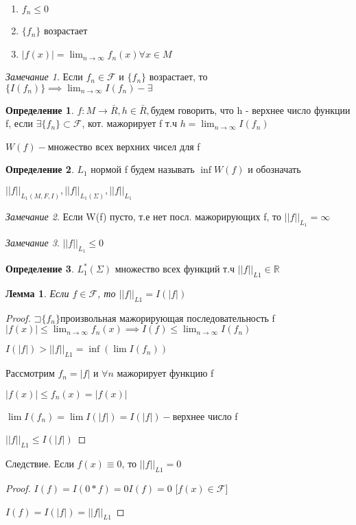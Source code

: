 \documentclass[a4paper]{article}
\newcommand\letsymbol{\mathord{\sqsupset}}
\newtheorem{lemma}{Лемма}[section]
\theoremstyle{definition}
\newtheorem*{definition}{Определение}
\theoremstyle{remark}
\newtheorem*{remark}{Замечание}
\begin{document}
\begin{enumerate}
     \item $f_n\leq 0$
     \item $\{f_n\}$ возрастает
     \item $|f(x)| = \lim_{n\to\infty}f_n(x)\forall x\in M$ 
\end{enumerate}
\begin{remark}
     Если $f_n\in \mathcal{F} $ и $\{f_n\}$ возрастает, то $\{I(f_n)\}\implies \lim_{n\to\infty}I(f_n)-\exists$
\end{remark}
\begin{definition}
     $f:M\to\bar{R}, h\in\bar{R},$будем говорить, что h - верхнее число
     функции f, если $\exists\{f_n\}\subset \mathcal{F} $, кот. мажорирует
     f т.ч $h = \lim_{n\to\infty}I(f_n)$

     $W(f) - $множество всех верхних чисел для f
\end{definition}
\begin{definition}
     $L_1$ нормой f будем называть $\inf W(f)$ и обозначать

     $||f||_{L_1(M, F, I)}, ||f||_{L_1(\Sigma)}, ||f||_{L_1}$
\end{definition}
\begin{remark}
     Если W(f) пусто, т.е нет посл. мажорирующих f, то $||f||_{L_1} = \infty$
\end{remark}
\begin{remark}
     $||f||_{L_1}\leq 0$
\end{remark}
\begin{definition}
     $L_1^*(\Sigma)$ множество всех функций т.ч $||f||_{L1}\in \mathbb{R} $
\end{definition}
\begin{lemma}
     Если $f\in\mathcal{F} $, то $||f||_{L1} = I(|f|)$
\end{lemma}
\begin{proof}
     $\letsymbol{}\{f_n\} $произвольная мажорирующая последовательность f
     $|f(x)|\leq \lim_{n\to\infty}f_n(x)\implies I(f)\leq \lim_{n\to\infty}I(f_n)$

     $I(|f|)>||f||_{L1} = \inf (\lim I(f_n))$

     Рассмотрим $f_n = |f|$ и $\forall n$ мажорирует функцию f

     $|f(x)|\leq f_n(x) = |f(x)|$

     $\lim I(f_n) = \lim I(|f|) = I(|f|) - $верхнее число f

     $||f||_{L1}\leq I(|f|)$
\end{proof}
Следствие. Если $f(x)\equiv 0$, то $||f||_{L1} = 0$
\begin{proof}
     $I(f) = I(0*f) = 0I(f) = 0$ [$f(x)\in\mathcal{F} $]
     
     $I(f) = I(|f|) = ||f||_{L1}$
\end{proof}
\end{document}
